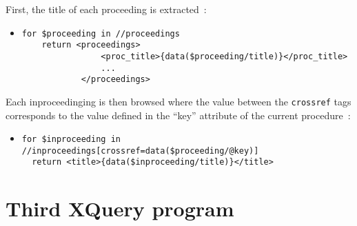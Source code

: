 \documentclass{article}
\begin{document}
  First, the title of each proceeding is extracted~:
  \begin{itemize}
    \item \begin{verbatim}
for $proceeding in //proceedings
    return <proceedings>
                <proc_title>{data($proceeding/title)}</proc_title>
                ...
            </proceedings>\end{verbatim}
  \end{itemize}
  
  Each inproceedinging is then browsed where the value between the \verb|crossref| tags corresponds to the value defined in the ``key'' attribute of the current procedure~:
  \begin{itemize}
    \item \begin{verbatim}
for $inproceeding in //inproceedings[crossref=data($proceeding/@key)]
  return <title>{data($inproceeding/title)}</title>\end{verbatim}
  \end{itemize}
  

\section{Third XQuery program}
\end{document}
